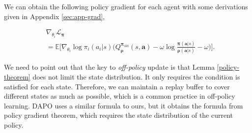 \documentclass{article}
\begin{document}
We can obtain the following policy gradient for each agent with some derivations given in Appendix \ref{sec:app-grad},
\iffalse
\begin{equation}%
	\nabla_{\theta_i} \mathcal{L}_{\bm{\pi}} = \mathbb{E}\bigg[  \nabla_{\theta_i} \log\pi_i(a_i|s)  \bigg( Q^{{\bm{\pi}}}_{\bm{\rho}}(s,\bm{a}) 
	- \omega \log \frac{{\bm{\pi}}(\bm{a}|s)}{{\bm{\rho}}(\bm{a}|s)} - \omega  \bigg) \bigg].
\end{equation}
\fi
\iffalse
\begin{gather*}%
	 \nabla_{\theta_i} \mathcal{L}_{\bm{\pi}} = \mathbb{E}\bigg[  \nabla_{\theta_i} \log\pi_i(a_i|s)  C^{{\bm{\pi}}}_{\bm{\rho}}(s,\bm{a}) \bigg], \\
	\text{where  } C^{{\bm{\pi}}}_{\bm{\rho}}(s,\bm{a}) = \ Q^{{\bm{\pi}}_{\operatorname{old}}}_{\bm{\rho}}(s,\bm{a}) 
	 - \omega \log \frac{{\bm{\pi}}(\bm{a}|s)}{{\bm{\rho}}(\bm{a}|s)} - \omega.  
\end{gather*}
\fi
\begin{equation*}
	\begin{split}
	    	& \nabla_{\theta_i} \mathcal{L}_{\bm{\pi}} \\
	    	& = \mathbb{E}\bigg[  \nabla_{\theta_i} \log\pi_i(a_i|s) \Big( Q^{{\bm{\pi}}_{\operatorname{old}}}_{\bm{\rho}}(s,\bm{a}) - \omega \log \frac{{\bm{\pi}}(\bm{a}|s)}{{\bm{\rho}}(\bm{a}|s)} - \omega \Big) \bigg].
	\end{split}
\end{equation*}

We need to point out that the key to \textit{off-policy} update is that Lemma \ref{policy-theorem} does not limit the state distribution. It only requires the condition is satisfied for each state. Therefore, we can maintain a replay buffer to cover different states as much as possible, which is a common practice in off-policy learning. DAPO uses a similar formula to ours, but it obtains the formula from policy gradient theorem, which requires the state distribution of the current policy.
\end{document}
